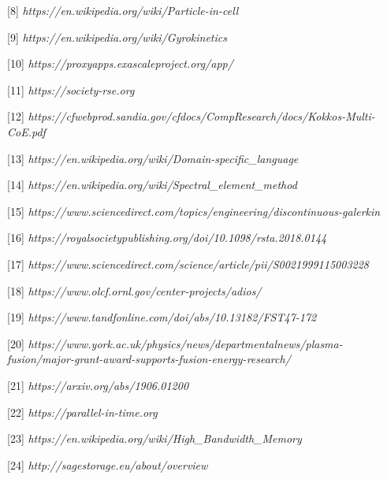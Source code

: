 \documentclass{article}
\begin{document}
\vspace{2pt}
[8]  {\color{color23} \emph{https://en.wikipedia.org/wiki/Particle-in-cell}}

\vspace{2pt}
[9]  {\color{color23} \emph{https://en.wikipedia.org/wiki/Gyrokinetics}}

\vspace{2pt}
[10] {\color{color23} \emph{https://proxyapps.exascaleproject.org/app/}}

\vspace{2pt}
[11] {\color{color23} \emph{https://society-rse.org}}

\vspace{2pt}
[12] {\color{color23} \emph{https://cfwebprod.sandia.gov/cfdocs/CompResearch/docs/Kokkos-Multi-CoE.pdf}}

\vspace{2pt}
[13] {\color{color23} \emph{https://en.wikipedia.org/wiki/Domain-specific\_language}}

\vspace{2pt}
[14] {\color{color23} \emph{https://en.wikipedia.org/wiki/Spectral\_element\_method}}

\vspace{2pt}
[15] {\color{color23} \emph{https://www.sciencedirect.com/topics/engineering/discontinuous-galerkin}}

\vspace{2pt}
[16] {\color{color23} \emph{https://royalsocietypublishing.org/doi/10.1098/rsta.2018.0144}}

\vspace{2pt}
[17] {\color{color23} \emph{https://www.sciencedirect.com/science/article/pii/S0021999115003228}}

\vspace{2pt}
[18] {\color{color23} \emph{https://www.olcf.ornl.gov/center-projects/adios/}}

\vspace{2pt}
[19] {\color{color23} \emph{https://www.tandfonline.com/doi/abs/10.13182/FST47-172}}

\vspace{2pt}
\leftskip=35pt
\parindent=-49pt
[20] {\color{color23} \emph{https://www.york.ac.uk/physics/news/departmentalnews/plasma-fusion/major-grant-award-supports-fusion-energy-research/}}

\vspace{2pt}
\leftskip=-14pt
\parindent=0pt
{\color{color29} [21] }{\color{color23} \emph{https://arxiv.org/abs/1906.01200}}

\vspace{2pt}
{\color{color29} [22] }{\color{color23} \emph{https://parallel-in-time.org}}

\vspace{2pt}
{\color{color29} [23] }{\color{color23} \emph{https://en.wikipedia.org/wiki/High\_Bandwidth\_Memory}}

\vspace{2pt}
{\color{color29} [24] }{\color{color23} \emph{http://sagestorage.eu/about/overview}}

\newpage
\end{document}
